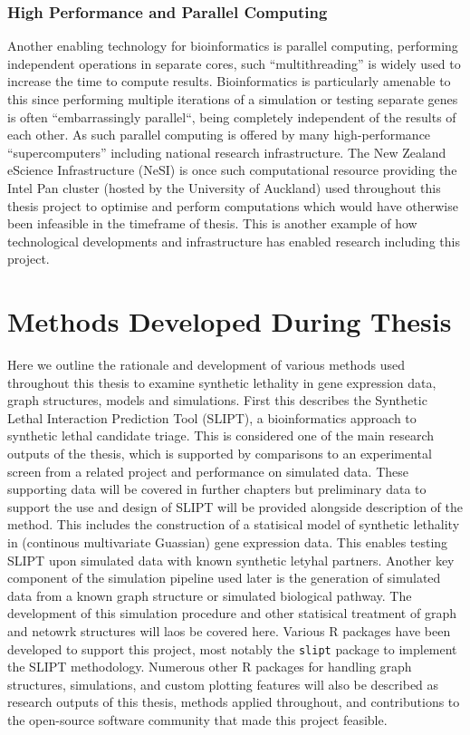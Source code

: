 \subsection{High Performance and Parallel Computing} \label{methods:HPC}
Another enabling technology for bioinformatics is parallel computing, performing independent operations in separate cores, such ``multithreading'' is widely used to increase the time to compute results. Bioinformatics is particularly amenable to this since performing multiple iterations of a simulation or testing separate genes is often ``embarrassingly parallel``, being completely independent of the results of each other. As such parallel computing is offered by many high-performance ``supercomputers'' including national research infrastructure. The New Zealand eScience Infrastructure (NeSI) is once such computational resource providing the Intel Pan cluster (hosted by the University of Auckland) used throughout this thesis project to optimise and perform computations which would have otherwise been infeasible in the timeframe of thesis. This is another example of how technological developments and infrastructure has enabled research including this project.  


\chapter{Methods Developed During Thesis}
\label{chap:methods_dev}

Here we outline the rationale and development of various methods used throughout this thesis to examine synthetic lethality in gene expression data, graph structures, models and simulations. First this describes the Synthetic Lethal Interaction Prediction Tool (SLIPT), a bioinformatics approach to synthetic lethal candidate triage. This is considered one of the main research outputs of the thesis, which is supported by comparisons to an experimental screen from a related project and performance on simulated data. These supporting data will be covered in further chapters but preliminary data to support the use and design of SLIPT will be provided alongside description of the method. This includes the construction of a statisical model of synthetic lethality in (continous multivariate Guassian) gene expression data. This enables testing SLIPT upon simulated data with known synthetic letyhal partners. Another key component of the simulation pipeline used later is the generation of simulated data from a known graph structure or simulated biological pathway. The development of this simulation procedure and other statisical treatment of graph and netowrk structures will laos be covered here. Various R packages have been developed to support this project, most notably the \texttt{slipt} package to implement the SLIPT methodology. Numerous other R packages for handling graph structures, simulations, and custom plotting features will also be described as research outputs of this thesis, methods applied throughout, and contributions to the open-source software community that made this project feasible.

